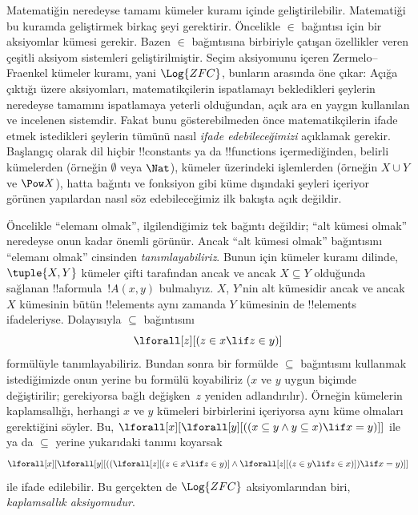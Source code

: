 



Matematiğin neredeyse tamamı kümeler kuramı içinde geliştirilebilir.
Matematiği bu kuramda geliştirmek birkaç şeyi gerektirir. Öncelikle
$\in$ bağıntısı için bir aksiyomlar kümesi gerekir. Bazen $\in$
bağıntısına birbiriyle çatışan özellikler veren çeşitli aksiyom
sistemleri geliştirilmiştir. Seçim aksiyomunu içeren Zermelo--Fraenkel
kümeler kuramı, yani $\Log{ZFC}$, bunların arasında öne çıkar: Açığa
çıktığı üzere aksiyomları, matematikçilerin ispatlamayı bekledikleri
şeylerin neredeyse tamamını ispatlamaya yeterli olduğundan, açık ara en
yaygın kullanılan ve incelenen sistemdir. Fakat bunu gösterebilmeden
önce matematikçilerin ifade etmek istedikleri şeylerin tümünü nasıl
\emph{ifade edebileceğimizi} açıklamak gerekir. Başlangıç olarak dil
hiçbir !!{constant}s ya da !!{function}s içermediğinden, belirli
kümelerden (örneğin $\emptyset$ veya $\Nat$), kümeler üzerindeki
işlemlerden (örneğin $X\cup Y$ ve $\Pow X$), hatta bağıntı ve fonksiyon
gibi küme dışındaki şeyleri içeriyor görünen yapılardan nasıl söz
edebileceğimiz ilk bakışta açık değildir.

Öncelikle ``elemanı olmak'', ilgilendiğimiz tek bağıntı değildir;
``alt kümesi olmak'' neredeyse onun kadar önemli görünür. Ancak ``alt
kümesi olmak'' bağıntısını ``elemanı olmak'' cinsinden
\emph{tanımlayabiliriz}. Bunun için kümeler kuramı dilinde, $\tuple{X,Y}$
kümeler çifti tarafından ancak ve ancak $X\subseteq Y$ olduğunda
sağlanan !!a{formula}~$!A(x,y)$ bulmalıyız. $X$, $Y$'nin alt kümesidir
ancak ve ancak $X$ kümesinin bütün !!{element}s aynı zamanda $Y$
kümesinin de !!{element}s ifadeleriyse. Dolayısıyla $\subseteq$
bağıntısını
\[
\lforall[z][(z \in x \lif z \in y)]
\]
formülüyle tanımlayabiliriz. Bundan sonra bir formülde $\subseteq$
bağıntısını kullanmak istediğimizde onun yerine bu formülü koyabiliriz
($x$ ve $y$ uygun biçimde değiştirilir; gerekiyorsa bağlı değişken~$z$
yeniden adlandırılır). Örneğin kümelerin kaplamsallığı, herhangi $x$ ve
$y$ kümeleri birbirlerini içeriyorsa aynı küme olmaları gerektiğini
söyler. Bu,
$\lforall[x][\lforall[y][((x\subseteq y\land y\subseteq x)\lif x=y)]]$
ile ya da $\subseteq$ yerine yukarıdaki tanımı koyarsak
\[
\lforall[x][\lforall[y][((\lforall[z][(z \in x \lif z \in y)] \land
    \lforall[z][(z \in y \lif z \in x)]) \lif x = y)]]
\]
ile ifade edilebilir. Bu gerçekten de $\Log{ZFC}$ aksiyomlarından biri,
\emph{kaplamsallık aksiyomudur}.

